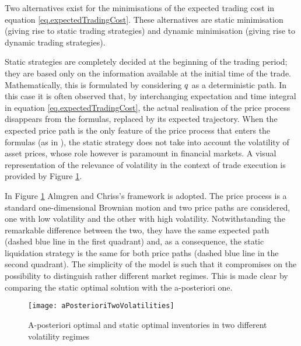 \documentclass[10pt,a4paper]{article}
\begin{document}
Two alternatives exist for the minimisations of the expected trading cost in equation \eqref{eq.expectedTradingCost}. These alternatives are static minimisation (giving rise to static trading strategies) and dynamic minimisation (giving rise to dynamic trading strategies).

Static strategies are  completely decided at the beginning of the trading period; they are based only on the information available  at the initial time of the trade. Mathematically, this is formulated by considering $q$ as a deterministic path. In this case it is often observed that,  by interchanging expectation and time integral in equation \eqref{eq.expectedTradingCost}, the actual realisation of the price process disappears from the formulas, replaced by its expected trajectory.  When the expected price path is the only feature of the price process that enters the formulas (as in \cite{AC00opt}), the static strategy does not take into account the volatility of asset prices, whose role however is paramount in financial markets.  A visual representation of the relevance of volatility in the context of trade execution is provided by Figure \ref{fig.aPosterioriTwoVolatilities}.

In Figure \ref{fig.aPosterioriTwoVolatilities} Almgren and Chriss's framework is adopted. The price process is  a standard one-dimensional Brownian motion and two price paths are considered, one with low volatility and the other with high volatility. Notwithstanding the remarkable difference between the two, they have the same expected path (dashed blue line in the first quadrant) and, as a consequence, the static liquidation strategy is the same for both price paths (dashed blue line in the second quadrant).  The simplicity of the model is such that it compromises on the possibility to distinguish rather different market regimes. This is made clear by comparing the static optimal solution with the a-posteriori one.

\begin{figure}
\centering
\texttt{[image: aPosterioriTwoVolatilities]}
\caption{{A-posteriori optimal and static optimal inventories in two different volatility regimes}}
\label{fig.aPosterioriTwoVolatilities}
\end{figure}
\end{document}
